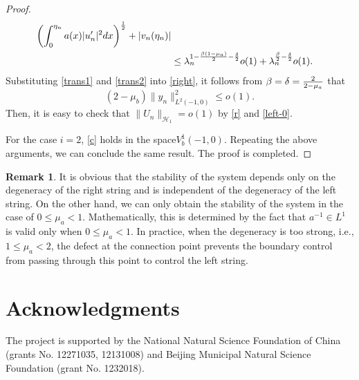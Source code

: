 \documentclass[twoside]{article}
\theoremstyle{noparens}
\theoremstyle{definition}
\newtheorem{remark}[definition]{Remark}
\numberwithin{equation}{section}
\numberwithin{figure}{section}
\begin{document}
\begin{proof}
\begin{equation}
\begin{split}
		\left(\int_{0}^{\eta_n}
		a(x)|u_n'|^2dx\right)^{1\over2}
		+|v_n(\eta_n)|\\
		&\leq \lambda_n^{1-{\beta(1-\mu_a)\over2}-{\delta\over2}}o(1)
		+\lambda_n^{{\beta\over2}-{\delta\over2}}o(1).
	\end{split}
\end{equation}
Substituting \eqref{trans1} and \eqref{trans2} into \eqref{right}, it follows from $\beta= \delta = {2\over2-\mu_a}$ that
\begin{equation}\label{left-0}
	(2-\mu_b)\|y_n\|^2_{L^2(-1,0)}\leq o(1).
\end{equation}
Then, it is easy to check that $\|U_n\|_{\mathcal H_1} =o(1)$ by \eqref{r} and \eqref{left-0}.

For the case $i=2$, \eqref{c} holds in the space$V_b^1(-1,0)$. Repeating the above arguments, we can conclude the same result. The proof is completed.
\end{proof}
\begin{remark}
It is obvious that the stability of the system depends only on the degeneracy of the right string and is independent of the degeneracy of the left string. On the other hand, we can only obtain the stability of the system in the case of  $0\leq\mu_a<1$. Mathematically, this is determined by the fact that $a^{-1}\in L^1$ is valid only when $0\leq\mu_a<1$. In practice, when the degeneracy is too strong, i.e., $1\leq\mu_a<2$, the defect at the connection point prevents the boundary control from passing through this point to control the left string.
\end{remark}

\section*{Acknowledgments}
The project is supported by the National Natural Science Foundation of China (grants No. 12271035, 12131008) and
Beijing Municipal Natural Science Foundation (grant No. 1232018).

%


\end{document}
